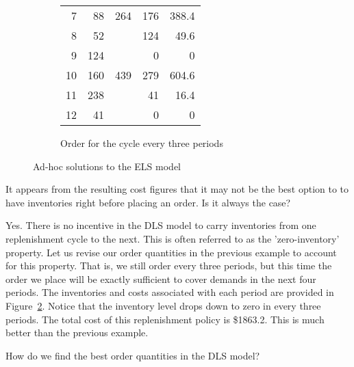 \begin{solution}
\begin{figure}[htbp]
\begin{subfigure}[b]{0.5\textwidth}
\begin{tabular}{rrrrr}
    7     & 88    & 264   & 176   & 388.4 \\
    8     & 52    &       & 124   & 49.6 \\
    9     & 124   &       & 0     & 0 \\
    10    & 160   & 439   & 279   & 604.6 \\
    11    & 238   &       & 41    & 16.4 \\
    12    & 41    &       & 0     & 0 \\
    \bottomrule
    \end{tabular}%
\caption{Order for the cycle every three periods}
\label{fig:3just}
\end{subfigure}
\caption{Ad-hoc solutions to the ELS model}
\end{figure}
\end{solution}


\begin{question}
It appears from the resulting cost figures that it may not be the best option to to have inventories right before placing an order. Is it always the case? 
\end{question}

\begin{solution}
Yes. There is no incentive in the DLS model to carry inventories from one replenishment cycle to the next. This is often referred to as the 'zero-inventory' property. Let us revise our order quantities in the previous example to account for this property. That is, we still order every three periods, but this time the order we place will be exactly sufficient to cover demands in the next four periods. The inventories and costs associated with each period are provided in Figure~\ref{fig:3just}. Notice that the inventory level drops down to zero in every three periods. The total cost of this replenishment policy is \$1863.2. This is much better than the previous example.
\end{solution}

\begin{question}
How do we find the best order quantities in the DLS model?
\end{question}


